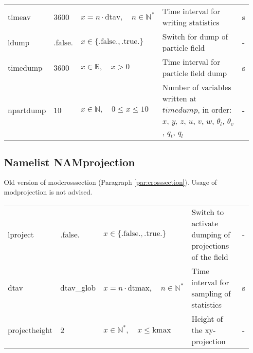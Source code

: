 \documentclass[twoside,11pt,fleqn,a4paper,english,openright]{report}
\begin{document}
\begin{center}
\begin{supertabular}{|l|p{1.6cm}|p{4cm}|p{6cm}|l|}
  timeav	& 3600		& $x = n \cdot \text{dtav}, \quad n \in \mathbb{N}^*$	& Time interval for writing statistics	& s\\
  ldump		& .false.	& $x\in\{\text{.false.},\text{.true.}\}$	& Switch for dump of particle field		& -\\
  timedump	& 3600		& $x \in \mathbb{R}, \quad x>0$	& Time interval for particle field dump		& s\\
  npartdump	& 10		& $x \in \mathbb{N}, \quad 0 \leq x \leq 10$	& Number of variables written at $timedump$, in order: $x$, $y$, $z$, $u$, $v$, $w$, $\theta_l$, $\theta_v$, $q_t$, $q_l$	& -\\
\end{supertabular}
\end{center}

\subsection{Namelist NAMprojection}\label{par:projection}
Old version of modcrosssection (Paragraph \ref{par:crosssection}). Usage of modprojection is not advised.
\begin{center}
  \tablelasttail{
        &&&&\\\hline
  }
\begin{supertabular}{|l|p{1.6cm}|p{4cm}|p{6cm}|l|}
  lproject	&	.false.	& $x\in\{\text{.false.},\text{.true.}\}$	& Switch to activate dumping of projections of the field	& -\\
  dtav		& dtav\_glob	& $x = n \cdot \text{dtmax}, \quad n \in \mathbb{N}^*$	& Time interval for sampling of statistics	& s\\
  projectheight	& 2	& $x \in \mathbb{N}^*, \quad x \le \text{kmax}$	& Height of the xy-projection & -\\
\end{supertabular}
\end{center}
\end{document}
